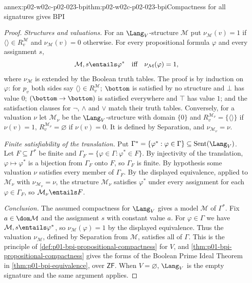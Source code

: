 \begin{annexitem}{annex:p02-w02c-p02-023-bpi}{thm:p02-w02c-p02-023-bpi}{Compactness for all signatures gives BPI}
\begin{proof}
\emph{Structures and valuations.}  For an \(\Lang_V\)-structure \(\mathcal M\)
put \(\nu_{\mathcal M}(v)=1\) if \(\langle\rangle\in R_v^{\mathcal M}\) and
\(\nu_{\mathcal M}(v)=0\) otherwise.  For every propositional formula
\(\varphi\) and every assignment \(s\),
\[
 \mathcal M,s\entails\varphi^{*}
 \quad\text{iff}\quad
 \nu_{\mathcal M}(\varphi)=1,
\]
where \(\nu_{\mathcal M}\) is extended by the Boolean truth tables.  The proof is
by induction on \(\varphi\): for \(p_v\) both sides say
\(\langle\rangle\in R_v^{\mathcal M}\); \(\bottom\) is satisfied by no structure and
\(\bot\) has value \(0\); \((\bottom\to\bottom)\) is satisfied everywhere
and \(\top\) has value \(1\); and the satisfaction clauses for \(\neg\),
\(\land\) and \(\lor\) match their truth tables.  Conversely, for a
valuation \(\nu\) let \(\mathcal M_\nu\) be the \(\Lang_V\)-structure with domain
\(\{0\}\) and \(R_v^{\mathcal M_\nu}=\{\langle\rangle\}\) if \(\nu(v)=1\),
\(R_v^{\mathcal M_\nu}=\varnothing\) if \(\nu(v)=0\).  It is defined by
Separation, and \(\nu_{\mathcal M_\nu}=\nu\).

\emph{Finite satisfiability of the translation.}  Put
\(\Gamma^{*}=\{\varphi^{*}:\varphi\in\Gamma\}\subseteq\operatorname{Sent}(\Lang_V)\).  Let
\(F\subseteq\Gamma^{*}\) be finite and
\(\Gamma_F=\{\varphi\in\Gamma:\varphi^{*}\in F\}\).  By injectivity of the
translation, \(\varphi\mapsto\varphi^{*}\) is a bijection from \(\Gamma_F\)
onto \(F\), so \(\Gamma_F\) is finite.  By hypothesis some valuation \(\nu\)
satisfies every member of \(\Gamma_F\).  By the displayed equivalence,
applied to \(\mathcal M_\nu\) with \(\nu_{\mathcal M_\nu}=\nu\), the structure
\(\mathcal M_\nu\) satisfies \(\varphi^{*}\) under every assignment for each
\(\varphi\in\Gamma_F\), so \(\mathcal M_\nu\entails F\).

\emph{Conclusion.}  The assumed compactness for \(\Lang_V\) gives a model
\(\mathcal M\) of \(\Gamma^{*}\).  Fix \(a\in\dom\mathcal M\) and the assignment \(s\)
with constant value \(a\).  For \(\varphi\in\Gamma\) we have
\(\mathcal M,s\entails\varphi^{*}\), so \(\nu_{\mathcal M}(\varphi)=1\) by the
displayed equivalence.  Thus the valuation \(\nu_{\mathcal M}\), defined by
Separation from \(\mathcal M\), satisfies all of \(\Gamma\).  This is the
principle of \cref{def:p01-bpi-propositional-compactness} for \(V\), and
\cref{thm:p01-bpi-propositional-compactness} gives the forms of the Boolean
Prime Ideal Theorem in \cref{thm:p01-bpi-equivalence}, over
\(\mathsf{ZF}\).  When \(V=\varnothing\), \(\Lang_V\) is the empty signature
and the same argument applies.
\end{proof}
\end{annexitem}
